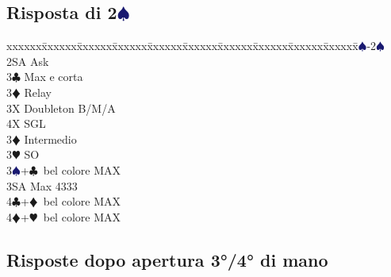 \documentclass[a4paper,italian]{article}
\newcommand{\BC}{\textcolor{OliveGreen}{$\clubsuit$}}
\newcommand{\BD}{\textcolor{RedOrange}{$\vardiamondsuit$}}
\newcommand{\BH}{\textcolor{Red2}{$\varheartsuit${}}}
\newcommand{\BS}{\textcolor{MidnightBlue}{$\spadesuit${}}}
\newcommand{\pdfs}{\texorpdfstring{\BS{}}{S}}
\newenvironment{bidtable}
{\begin{tabbing}

    xxxxxx\=xxxxxx\=xxxxxx\=xxxxxx\=xxxxxx\=xxxxxx\=xxxxxx\=xxxxxx\=xxxxxx\=xxxxxx\=\kill}
{\end{tabbing} }%
\begin{document}
\begin{multicols}{2}
                                        \subsection{Risposta di 2\pdfs}
                                        \begin{bidtable}
                                            1\BS-2\BS\+\\
                                            2SA \> Ask\+\\
                                            3\BC \> Max e corta\+\\
                                            3\BD \> Relay\+\\
                                            3X \> Doubleton B/M/A\\
                                            4X \> SGL\-\-\\
                                            3\BD \> Intermedio\\
                                            3\BH \> SO\\
                                            3\BS {}+\BC\ bel colore MAX\\
                                            3SA \> Max 4333\\
                                            4\BC {}+\BD\ bel colore MAX\\
                                            4\BD {}+\BH\ bel colore MAX\-\-
                                        \end{bidtable}
                                        \columnbreak
                                        \subsection{Risposte dopo apertura 3°/4° di mano}


\end{multicols}
\end{document}
